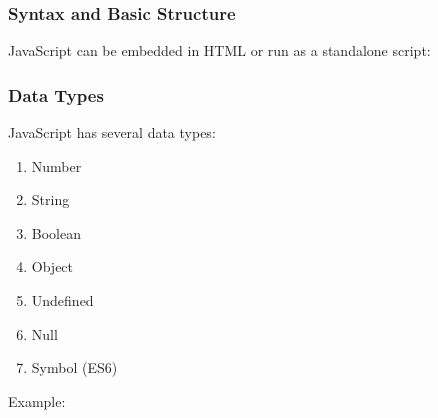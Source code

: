 \hypertarget{syntax-and-basic-structure-2}{%
\subsubsection{Syntax and Basic
Structure}\label{syntax-and-basic-structure-2}}

JavaScript can be embedded in HTML or run as a standalone script:

\begin{Shaded}
\begin{Highlighting}[]
 
    \NormalTok{(}\SpecialCharTok{$\{}\SpecialCharTok{\}}\VerbatimStringTok{!\textasciigrave{}}\NormalTok{)}\OperatorTok{;}
\NormalTok{\}}

\NormalTok{(}\NormalTok{)}\OperatorTok{;}
\end{Highlighting}
\end{Shaded}

\hypertarget{data-types-2}{%
\subsubsection{Data Types}\label{data-types-2}}

JavaScript has several data types:

\begin{enumerate}
\def\labelenumi{\arabic{enumi}.}
\tightlist
\item
  Number
\item
  String
\item
  Boolean
\item
  Object
\item
  Undefined
\item
  Null
\item
  Symbol (ES6)
\end{enumerate}

Example:

\begin{Shaded}
\begin{Highlighting}[]
\OperatorTok{=} \OperatorTok{;}
\OperatorTok{=} \OperatorTok{;}
\OperatorTok{=} \OperatorTok{;}
\OperatorTok{=}\NormalTok{ \{}\OperatorTok{:} \OperatorTok{,} \OperatorTok{:} \NormalTok{\}}\OperatorTok{;}
\OperatorTok{=}\NormalTok{ [}\OperatorTok{,} \OperatorTok{,} \NormalTok{]}\OperatorTok{;}
\end{Highlighting}
\end{Shaded}

